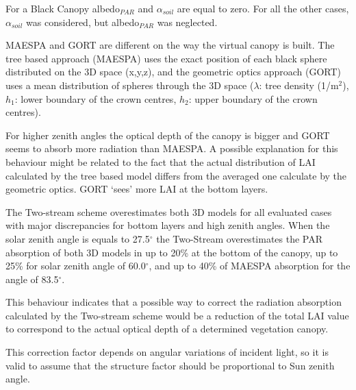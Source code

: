 \documentclass[a4paper,11pt]{report}
\begin{document}
For a Black Canopy albedo$_{PAR}$ and $\alpha_{soil}$ are equal to zero. For all the other cases, $\alpha_{soil}$ was considered, but albedo$_{PAR}$ was neglected.

MAESPA and GORT are different on the way the virtual canopy is built. The tree based approach (MAESPA) uses the exact position of each black sphere distributed on the 3D space (x,y,z), and the geometric optics approach (GORT) uses a mean distribution of spheres through the 3D space ($\lambda$: tree density (1/m$^2$), $h_1$: lower boundary of the crown centres, $h_2$: upper boundary of the crown centres). 

For higher zenith angles the optical depth of the canopy is bigger and GORT seems to absorb more radiation than MAESPA. A possible explanation for this behaviour might be related to the fact that the actual distribution of LAI calculated by the tree based model differs from the averaged one calculate by the geometric optics. GORT `sees' more LAI at the bottom layers. 

The Two-stream scheme overestimates both 3D models for all evaluated cases with major discrepancies for bottom layers and high zenith angles. When the solar zenith angle is equals to 27.5$^{\circ}$ the Two-Stream overestimates the PAR absorption of both 3D models in up to 20\% at the bottom of the canopy, up to 25\% for solar zenith angle of 60.0$^{\circ}$, and up to 40\% of MAESPA absorption for the angle of 83.5$^{\circ}$.

This behaviour indicates that a possible way to correct the radiation absorption calculated by the Two-stream scheme would be a reduction of the total LAI value to correspond to the actual optical depth of a determined vegetation canopy. 

This correction factor depends on angular variations of incident light, so it is valid to assume that the structure factor should be proportional to Sun zenith angle.
\end{document}
